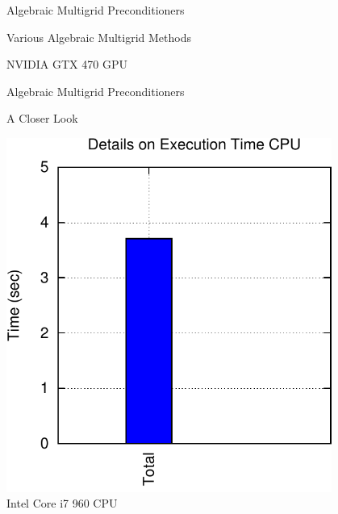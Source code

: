 \begin{frame}{Algebraic Multigrid Preconditioners}
\begin{block}{Various Algebraic Multigrid Methods}
\begin{minipage}{0.48\textwidth}
\begin{center}
   NVIDIA GTX 470 GPU
  \end{center}
  \end{minipage}
 \end{block}

  \vspace*{0.6cm}

\end{frame}




\begin{frame}{Algebraic Multigrid Preconditioners}

 \begin{block}{A Closer Look}
  \vspace*{0.3cm}
  \begin{minipage}{0.48\textwidth}
  \begin{center}
   \includegraphics[width=0.8\textwidth]{figures/bench-details-cpu-1.pdf}\\
   Intel Core i7 960 CPU
  \end{center}
  \end{minipage}
  \begin{minipage}{0.48\textwidth}
  \begin{center}

\end{center}
\end{minipage}
\end{block}
\end{frame}

